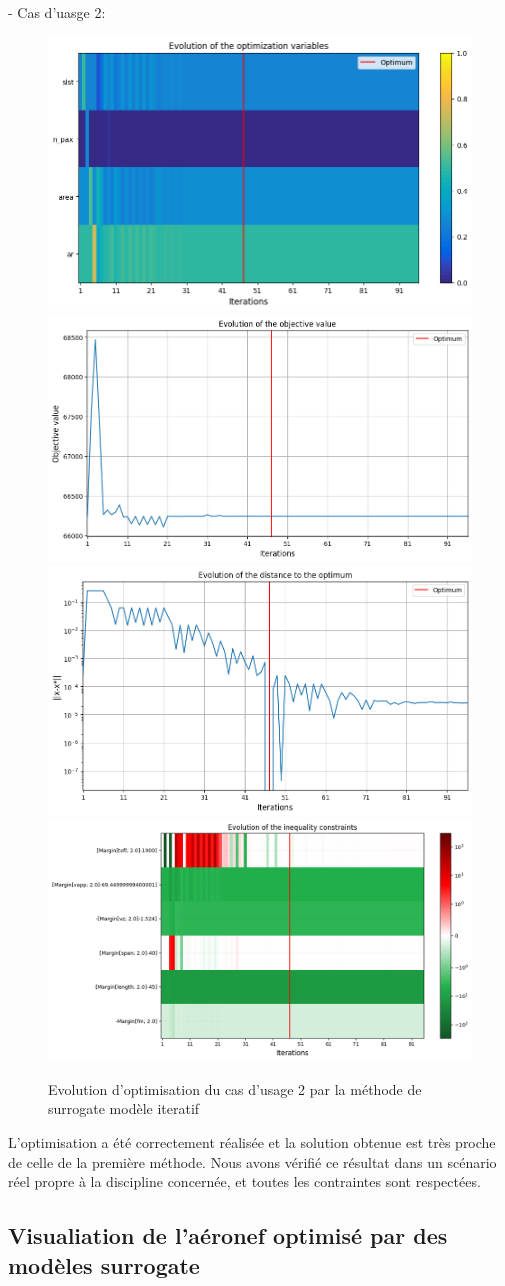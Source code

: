 \documentclass[a4paper, 11pt]{article}
\begin{document}
- Cas d'uasge 2: 
\begin{figure}[H]
    \centering
    \includegraphics[width=0.45\linewidth]{Images_case_2/p3u2_iter.png}
    \includegraphics[width=0.45\linewidth]{Images_case_2/p3u2_iter_evol_obj.png}
    \includegraphics[width=0.45\linewidth]{Images_case_2/p3u2_iter_evol_dist.png}
    \includegraphics[width=0.45\linewidth]{Images_case_2/p3u2_iter_evol_constraint.png}
    \caption{Evolution d'optimisation du cas d'usage 2 par la méthode de surrogate modèle iteratif}
    \label{fig:p3u2_iter_c2}
\end{figure}

L’optimisation a été correctement réalisée et la solution obtenue est très proche de celle de la première méthode. Nous avons vérifié ce résultat dans un scénario réel propre à la discipline concernée, et toutes les contraintes sont respectées.

\subsection{Visualiation de l'aéronef optimisé par des modèles surrogate}
\end{document}
